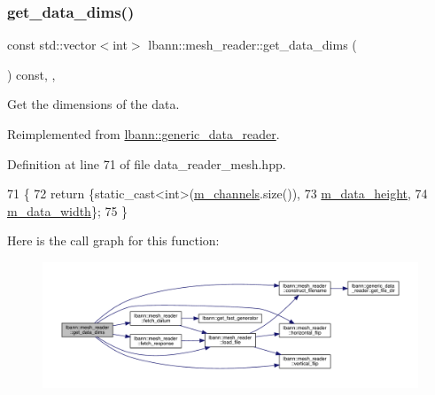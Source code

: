 \mbox{\label{classlbann_1_1mesh__reader_a8845023baeb8e9c51f3d690347b1213f}} 
\subsubsection{\texorpdfstring{get\+\_\+data\+\_\+dims()}{get\_data\_dims()}}
{\footnotesize\ttfamily const std\+::vector$<$int$>$ lbann\+::mesh\+\_\+reader\+::get\+\_\+data\+\_\+dims (\begin{DoxyParamCaption}{ }\end{DoxyParamCaption}) const\hspace{0.3cm}{\ttfamily [inline]}, {\ttfamily [override]}, {\ttfamily [virtual]}}



Get the dimensions of the data. 



Reimplemented from \hyperlink{classlbann_1_1generic__data__reader_ae06ff27459ac4a5d8ac14655d4b31318}{lbann\+::generic\+\_\+data\+\_\+reader}.



Definition at line 71 of file data\+\_\+reader\+\_\+mesh.\+hpp.


\begin{DoxyCode}
71                                                       \{
72     \textcolor{keywordflow}{return} \{\textcolor{keyword}{static\_cast<}\textcolor{keywordtype}{int}\textcolor{keyword}{>}(\hyperlink{classlbann_1_1mesh__reader_a9260add45b0421acb0ab28dd8f6d8cc6}{m\_channels}.size()),
73         \hyperlink{classlbann_1_1mesh__reader_aeb4e0df4e0be56244df5b663e2940d11}{m\_data\_height},
74         \hyperlink{classlbann_1_1mesh__reader_a8e16a565b0afd3097a0b6fe31a94641e}{m\_data\_width}\};
75   \}
\end{DoxyCode}
Here is the call graph for this function\+:\nopagebreak
\begin{figure}[H]
\begin{center}
\leavevmode
\includegraphics[width=350pt]{classlbann_1_1mesh__reader_a8845023baeb8e9c51f3d690347b1213f_cgraph}
\end{center}
\end{figure}
\mbox{\label{classlbann_1_1mesh__reader_a52c9bccdfed2a06f69023755513f4cde}} 
